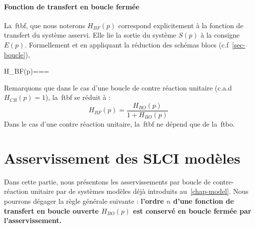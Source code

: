 \paragraph{Fonction de transfert en boucle fermée}
La~\gls{ftbf}, que nous noterons $H_{BF}(p)$ correspond
explicitement à la fonction de transfert du système asservi. 
Elle lie la sortie du système $S(p)$ à la consigne $E(p)$. Formellement et en 
appliquant la réduction des schémas blocs (c.f~\cref{sec-boucle}),
\begin{bequation}
    H_{BF}(p)===
\end{bequation}
Remarquons que dans le cas d'une boucle de contre réaction unitaire 
(c.a.d $H_{CR}(p)=1$), la~\gls{ftbf} se réduit à :
\[
H_{BF}(p)=\dfrac{H_{BO}(p)}{1+H_{BO}(p)}
\]
Dans le cas d'une contre réaction unitaire, la~\gls{ftbf} ne dépend 
que de la~\gls{ftbo}.
\section{Asservissement des SLCI modèles}
Dans cette partie, nous présentons les asservissements par boucle 
de contre-réaction unitaire par de systèmes modèles déjà introduits 
au~\cref{chap-model}. Nous pourrons dégager la règle générale suivante :
\textbf{l'ordre $n$ d'une fonction de transfert en boucle ouverte $H_{BO}(p)$
est conservé en boucle fermée par l'asservissement.}
